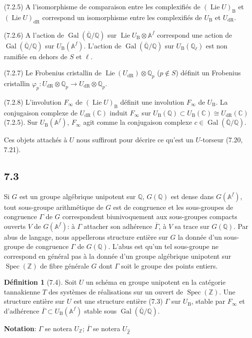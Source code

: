 \documentclass[12pt,a4paper]{article}
\theoremstyle{plain}
\theoremstyle{definition}
\newtheorem{definition}[theorem]{D\'efinition}
\theoremstyle{remark}
\DeclareMathOperator{\Spec}{Spec}
\DeclareMathOperator{\Gal}{Gal}
\DeclareMathOperator{\Lie}{Lie}
\newcommand{\DR}{\mathrm{dR}}
\newcommand{\B}{\mathrm{B}}
\newcommand{\Z}{\mathbb{Z}}
\newcommand{\Q}{\mathbb{Q}}
\newcommand{\C}{\mathbb{C}}
\newcommand{\A}{\mathbb{A}}
\begin{document}
(7.2.5) A l'isomorphisme de comparaison entre les complexifiés de $(\Lie U)_\B$ et $(\Lie U)_\DR$ correspond un isomorphisme entre les complexifiés de $U_\B$ et $U_\DR$.

(7.2.6) A l'action de $\Gal(\overline{\Q}/\Q)$ sur $\Lie U_\B 
\otimes 
\A^f$ correspond une action de $\Gal(\overline{\Q}/\Q)$ sur $U_\B(\A^f)$. L'action de $\Gal(\overline{\Q}/\Q)$ sur $U_\B(\Q_\ell)$ est non ramifiée en dehors de $S$ et $\ell$.

(7.2.7) Le Frobenius cristallin de $\Lie(U_\DR) 
\otimes 
\Q_p$ ($p 
\notin S$) définit un Frobenius cristallin $\varphi_p: U_\DR 
\otimes 
\Q_p 
\to U_\DR 
\otimes 
\Q_p$.

(7.2.8) L'involution $F_\infty$ de $(\Lie U)_\B$ définit une involution $F_\infty$ de $U_\B$. La conjugaison complexe de $U_\DR(\C)$ induit $F_\infty$ sur $U_\B(\Q) 
\subset U_\B(\C) 
\cong U_\DR(\C)$ (7.2.5). Sur $U_\B(\A^f)$, $F_\infty$ agit comme la conjugaison complexe $c 
\in 
\Gal(\overline{\Q}/\Q)$.

Ces objets attachés à $U$ nous suffiront pour décrire ce qu'est un $U$-torseur (7.20, 7.21).

\subsection*{7.3}
Si $G$ est un groupe algébrique unipotent sur $\Q$, $G(\Q)$ est dense dans $G(\A^f)$, tout sous-groupe arithmétique de $G$ est de congruence et les sous-groupes de congruence $\Gamma$ de $G$ correspondent biunivoquement aux sous-groupes compacts ouverts $V$ de $G(\A^f)$: à $\Gamma$ attacher son adhérence $\overline{\Gamma}$, à $V$ sa trace sur $G(\Q)$. Par abus de langage, nous appellerons structure entière sur $G$ la donnée d'un sous-groupe de congruence $\Gamma$ de $G(\Q)$. L'abus est qu'un tel sous-groupe ne correspond en général pas à la donnée d'un groupe algébrique unipotent sur $\Spec(\Z)$ de fibre générale $G$ dont $\Gamma$ soit le groupe des points entiers.

\begin{definition}[7.4]\label{def:7.4}
Soit $U$ un schéma en groupe unipotent en la catégorie tannakienne $T$ des systèmes de réalisations sur un ouvert de $\Spec(\Z)$. Une structure entière sur $U$ est une structure entière (7.3) $\Gamma$ sur $U_\B$, stable par $F_\infty$ et d'adhérence $\overline{\Gamma} 
\subset U_\B(\A^f)$ stable sous $\Gal(\overline{\Q}/\Q)$.
\end{definition}

\textbf{Notation}: $\Gamma$ se notera $U_\Z$; $\overline{\Gamma}$ se notera $U_{\hat{\Z}}$
\end{document}
